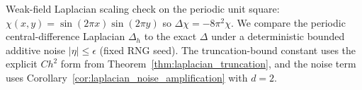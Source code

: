 \noindent\AuditTag Weak-field Laplacian scaling check on the periodic unit square: $\chi(x,y)=\sin(2\pi x)\sin(2\pi y)$ so $\Delta\chi=-8\pi^2\chi$. We compare the periodic central-difference Laplacian $\Delta_h$ to the exact $\Delta$ under a deterministic bounded additive noise $|\eta|\le \epsilon$ (fixed RNG seed). The truncation-bound constant uses the explicit $C h^2$ form from Theorem~\ref{thm:laplacian_truncation}, and the noise term uses Corollary~\ref{cor:laplacian_noise_amplification} with $d=2$.
